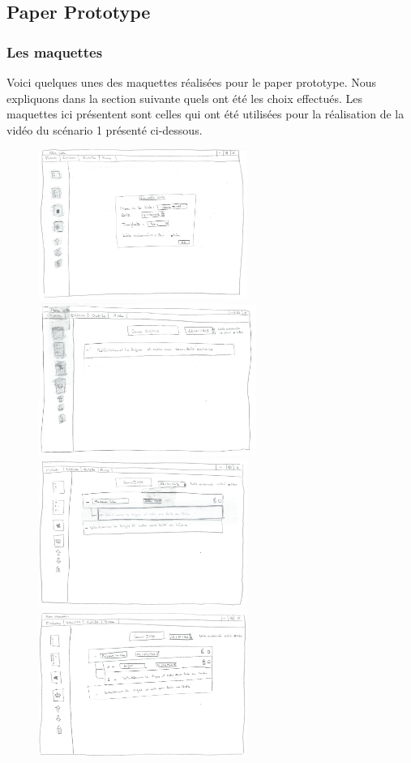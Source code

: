 \documentclass[a4paper,10pt]{article}
\begin{document}
\subsection{Paper Prototype}

\subsubsection{Les maquettes}
Voici quelques unes des maquettes réalisées pour le paper prototype. Nous expliquons dans la section suivante quels ont été les choix effectués. Les maquettes ici présentent sont celles qui ont été utilisées pour la réalisation de la vidéo du scénario 1 présenté ci-dessous.
\begin{figure}[H]
    \center
    \includegraphics[width=6.8cm]{Images/maquette1.jpeg}
    \includegraphics[width=7.1cm]{Images/maquette2.jpeg}
    \includegraphics[width=6.8cm]{Images/maquette3.jpeg}
    \includegraphics[width=6.8cm]{Images/maquette4.jpeg}

\end{figure}
\end{document}
